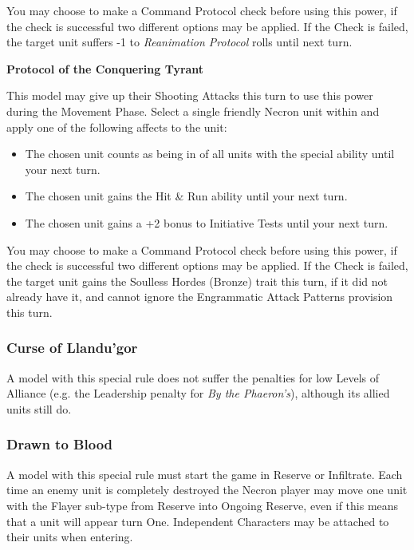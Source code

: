 \begin{multicols}{2}
You may choose to make a Command Protocol check before using this power, if the check is successful two different options may be applied. If the Check is failed, the target unit suffers -1 to \textit{Reanimation Protocol} rolls until next turn.

\textbf{Protocol of the Conquering Tyrant}

This model may give up their Shooting Attacks this turn to use this power during the Movement Phase. Select a single friendly Necron unit within  and apply one of the following affects to the unit:

\begin{itemize}
	\itemsep 0pt
	\item The chosen unit counts as being in  of all units with the  special ability until your next turn.
	\item The chosen unit gains the Hit \& Run ability until your next turn.
	\item The chosen unit gains a +2 bonus to Initiative Tests until your next turn.
\end{itemize}

You may choose to make a Command Protocol check before using this power, if the check is successful two different options may be applied. If the Check is failed, the target unit gains the Soulless Hordes (Bronze) trait this turn, if it did not already have it, and cannot ignore the Engrammatic Attack Patterns provision this turn.

\subsubsection{Curse of Llandu'gor} \label{Curse of Llandu'gor}

A model with this special rule does not suffer the penalties for low Levels of Alliance (e.g. the Leadership penalty for \textit{By the Phaeron's}), although its allied units still do.

\subsubsection{Drawn to Blood} \label{Drawn to Blood}

A model with this special rule must start the game in Reserve or Infiltrate. Each time an enemy unit is completely destroyed the Necron player may move one unit with the Flayer sub-type from Reserve into Ongoing Reserve, even if this means that a unit will appear turn One. Independent Characters may be attached to their units when entering.


\end{multicols}
